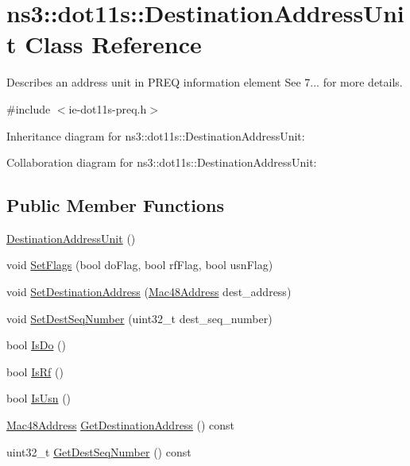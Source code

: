 \hypertarget{classns3_1_1dot11s_1_1DestinationAddressUnit}{}\section{ns3\+:\+:dot11s\+:\+:Destination\+Address\+Unit Class Reference}
\label{classns3_1_1dot11s_1_1DestinationAddressUnit}


Describes an address unit in P\+R\+EQ information element See 7... for more details.  




{\ttfamily \#include $<$ie-\/dot11s-\/preq.\+h$>$}



Inheritance diagram for ns3\+:\+:dot11s\+:\+:Destination\+Address\+Unit\+:


Collaboration diagram for ns3\+:\+:dot11s\+:\+:Destination\+Address\+Unit\+:
\subsection*{Public Member Functions}
\begin{DoxyCompactItemize}
\item 
\hyperlink{classns3_1_1dot11s_1_1DestinationAddressUnit_aeb84101a90f5c34e820916daf54504fc}{Destination\+Address\+Unit} ()
\item 
void \hyperlink{classns3_1_1dot11s_1_1DestinationAddressUnit_ac97f8c0753aa8c1d6ac0a1a54234dc6d}{Set\+Flags} (bool do\+Flag, bool rf\+Flag, bool usn\+Flag)
\item 
void \hyperlink{classns3_1_1dot11s_1_1DestinationAddressUnit_aca80bd9d70ca669b6f1e524ebb4d60dd}{Set\+Destination\+Address} (\hyperlink{classns3_1_1Mac48Address}{Mac48\+Address} dest\+\_\+address)
\item 
void \hyperlink{classns3_1_1dot11s_1_1DestinationAddressUnit_ab312fd38fbff232dc3b5601c5b90c15e}{Set\+Dest\+Seq\+Number} (uint32\+\_\+t dest\+\_\+seq\+\_\+number)
\item 
bool \hyperlink{classns3_1_1dot11s_1_1DestinationAddressUnit_a571b045dd4920ec1ced2a74a6b6bc27a}{Is\+Do} ()
\item 
bool \hyperlink{classns3_1_1dot11s_1_1DestinationAddressUnit_a7e37ed7afc044b109ff5f2369d3969ed}{Is\+Rf} ()
\item 
bool \hyperlink{classns3_1_1dot11s_1_1DestinationAddressUnit_a57c4c7f9a0142f229edfb38444309751}{Is\+Usn} ()
\item 
\hyperlink{classns3_1_1Mac48Address}{Mac48\+Address} \hyperlink{classns3_1_1dot11s_1_1DestinationAddressUnit_ac4c9cd44e4732eb6a206e1230fcd3c9d}{Get\+Destination\+Address} () const 
\item 
uint32\+\_\+t \hyperlink{classns3_1_1dot11s_1_1DestinationAddressUnit_a3e089bfe424b2c518c737255e1d04848}{Get\+Dest\+Seq\+Number} () const 
\end{DoxyCompactItemize}

